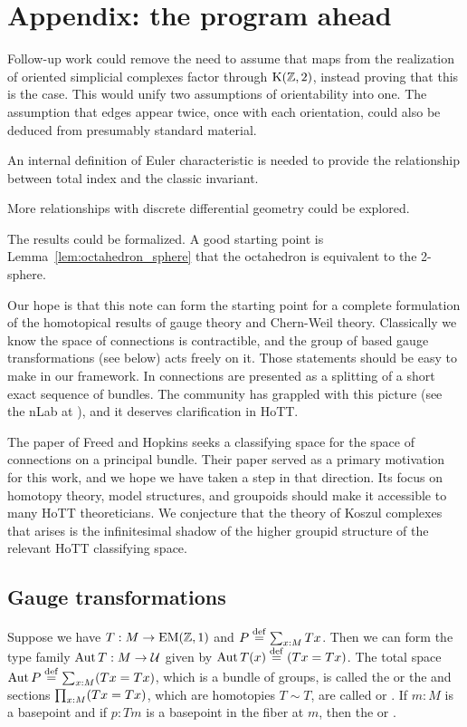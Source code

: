 \section{Appendix: the program ahead}

Follow-up work could remove the need to assume that maps from the realization of oriented simplicial complexes factor through \( \mathrm{K}(\mathbb{Z},2) \), instead proving that this is the case. This would unify two assumptions of orientability into one. The assumption that edges appear twice, once with each orientation, could also be deduced from presumably standard material.

An internal definition of Euler characteristic is needed to provide the relationship between total index and the classic invariant.

More relationships with discrete differential geometry\cite{crane_ddg}\cite{crane_connections} could be explored.

The results could be formalized. A good starting point is Lemma~\ref{lem:octahedron_sphere} that the octahedron is equivalent to the 2-sphere.

Our hope is that this note can form the starting point for a complete formulation of the homotopical results of gauge theory and Chern-Weil theory. Classically we know the space of connections is contractible, and the group of based gauge transformations (see below) acts freely on it. Those statements should be easy to make in our framework. In \cite{atiyah1983yang} connections are presented as a splitting of a short exact sequence of bundles. The community has grappled with this picture (see the nLab at \cite{urs_atiyah}), and it deserves clarification in HoTT.

The paper of Freed and Hopkins\cite{freed2013chernweil} seeks a classifying space for the space of connections on a principal bundle. Their paper served as a primary motivation for this work, and we hope we have taken a step in that direction. Its focus on homotopy theory, model structures, and groupoids should make it accessible to many HoTT theoreticians. We conjecture that the theory of Koszul complexes that arises is the infinitesimal shadow of the higher groupid structure of the relevant HoTT classifying space.

\subsection{Gauge transformations}
\begin{mydef}
\label{sec:automorphisms}
Suppose we have \( T:M\to\mathrm{EM}(\mathbb{Z},1) \) and \( P\stackrel{\mathrm{def}}{=}\sum_{x:M}Tx \). Then we can form the type family \( \operatorname{Aut} T:M\to\mathcal{U} \) given by \( \operatorname{Aut} T(x)\stackrel{\mathrm{def}}{=}(Tx=Tx) \). The total space \( \operatorname{Aut} P\stackrel{\mathrm{def}}{=}\sum_{x:M}(Tx=Tx) \), which is a bundle of groups, is called the  or the  and sections \( \prod_{x:M}(Tx=Tx) \), which are homotopies \( T\sim T \), are called  or . If \( m:M \) is a basepoint and if \( p:Tm \) is a basepoint in the fiber at \( m \), then the  or .
\end{mydef}
